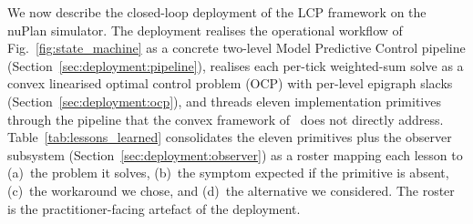 
We now describe the closed-loop deployment of the LCP framework on the nuPlan simulator. The deployment realises the operational workflow of Fig.~\ref{fig:state_machine} as a concrete two-level Model Predictive Control pipeline (Section~\ref{sec:deployment:pipeline}), realises each per-tick weighted-sum solve as a convex linearised optimal control problem (OCP) with per-level epigraph slacks (Section~\ref{sec:deployment:ocp}), and threads eleven implementation primitives through the pipeline that the convex framework of~\cite{lcp2025} does not directly address. Table~\ref{tab:lessons_learned} consolidates the eleven primitives plus the observer subsystem (Section~\ref{sec:deployment:observer}) as a roster mapping each lesson to (a)~the problem it solves, (b)~the symptom expected if the primitive is absent, (c)~the workaround we chose, and (d)~the alternative we considered. The roster is the practitioner-facing artefact of the deployment.

